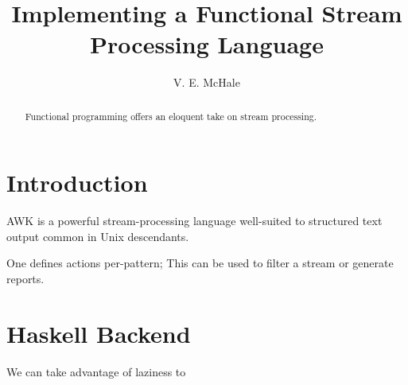 \documentclass{article}
\begin{document}
\title{Implementing a Functional Stream Processing Language}
\author{V. E. McHale}
\maketitle

\begin{abstract}
  Functional programming offers an eloquent take on stream processing.
\end{abstract}

\section{Introduction}

AWK is a powerful stream-processing language\cite{awkbook} well-suited to structured text output common in Unix descendants.

One defines actions per-pattern; 
This can be used to filter a stream or generate reports.

\section{Haskell Backend}

We can take advantage of laziness to





\end{document}
